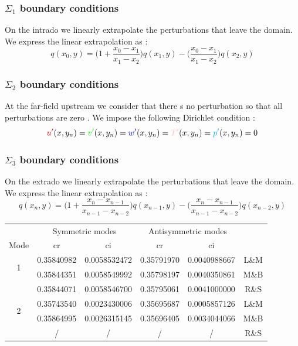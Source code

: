 \documentclass[ border=0pt, a4paper, 11pt]{article}
\numberwithin{equation}{section}
\numberwithin{equation}{section}
\renewcommand{\u}{\textcolor{red}{u'}}
\renewcommand{\v}{\textcolor{green}{v'}}
\newcommand{\w}{\textcolor{blue}{w'}}
\newcommand{\p}{\textcolor{cyan}{p'}}
\newcommand{\T}{\textcolor{pink}{T'}}
\begin{document}
\subsubsection{$\Sigma_{1}$ boundary conditions}
On the intrado we linearly extrapolate the perturbations that leave the domain.
We express the linear extrapolation as :
\begin{equation}
q (x_{0},y) = \bigg(1+\frac{x_{0}-x_{1}}{x_{1}-x_{2}}\bigg) q (x_{1},y) -\bigg(\frac{x_{0}-x_{1}}{x_{1}-x_{2}}\bigg)
q (x_{2},y) 
\end{equation} 
\subsubsection{$\Sigma_{2}$ boundary conditions}
At the far-field upstream we consider that there s no perturbation so that all perturbations are zero . We impose the following Dirichlet condition : $$ \u (x,y_{n}) =\v (x,y_{n})=\w (x,y_{n})=\T (x,y_{n})=\p (x,y_{n})=0 $$
\subsubsection{$\Sigma_{3}$ boundary conditions}
On the extrado we linearly extrapolate the perturbations that leave the domain.
We express the linear extrapolation as :
\begin{equation}
q (x_{n},y) = \bigg(1+\frac{x_{n}-x_{n-1}}{x_{n-1}-x_{n-2}}\bigg) q (x_{n-1},y) -\bigg(\frac{x_{n}-x_{n-1}}{x_{n-1}-x_{n-2}}\bigg)
q (x_{n-2},y) 
\end{equation} 

\begin{tabular}{c c c c c c}
  & \multicolumn{2}{c}{Symmetric modes} &\multicolumn{2}{c}{Antisymmetric modes} &\\
  Mode & cr & ci & cr & ci &  \\
  \multirow{2}{*}{1} & 0.35840982 & 0.0058532472 & 0.35791970 & 0.0040988667 & L\&M\\
   & 0.35844351 & 0.0058549992 & 0.35798197 & 0.0040350861 & M\&B \\
   & 0.35844071 & 0.0058546700 & 0.35795061 & 0.0041000000 & R\&S \\
    \hline
   \multirow{2}{*}{2} & 0.35743540 & 0.0023430006 & 0.35695687 & 0.0005857126 & L\&M \\
   & 0.35864995  & 0.0026315145 & 0.35696405 & 0.0034044066 & M\&B\\
   & /  & / & / & / & R\&S\\
\end{tabular}\\
\end{document}
